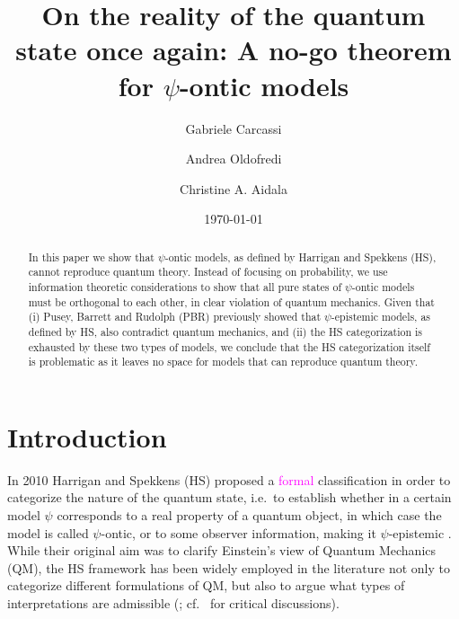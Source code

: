 \documentclass[10pt,twocolumn, nofootinbib]{revtex4-2}
\begin{document}
\title{On the reality of the quantum state once again: A no-go theorem for $\psi$-ontic models}
\author{Gabriele Carcassi}
\author{Andrea Oldofredi}
\author{Christine A. Aidala}
\vspace{2mm}

\date{\today}


\begin{abstract}
In this paper we show that $\psi$-ontic models, as defined by Harrigan and Spekkens (HS), cannot reproduce quantum theory. Instead of focusing on probability, we use information theoretic considerations to show that all pure states of $\psi$-ontic models must be orthogonal to each other, in clear violation of quantum mechanics. Given that (i) Pusey, Barrett and Rudolph (PBR) previously showed that $\psi$-epistemic models, as defined by HS, also contradict quantum mechanics, and (ii) the HS categorization is exhausted by these two types of models, we conclude that the HS categorization itself is problematic as it leaves no space for models that can reproduce quantum theory.
\end{abstract}

\maketitle

\section{Introduction}
 
In 2010 Harrigan and Spekkens (HS) proposed a \textcolor{magenta}{formal} classification in order to categorize the nature of the quantum state, i.e.\ to establish whether in a certain model $\psi$ corresponds to a real property of a quantum object, in which case the model is called $\psi$-ontic, or to some observer information, making it $\psi$-epistemic \cite{Harrigan:2010}. While their original aim was to clarify Einstein's view of Quantum Mechanics (QM), the HS framework has been widely employed in the literature not only to categorize different formulations of QM, but also to argue what types of interpretations are admissible (\cite{Leifer:2013, Leifer:2017, Branciard:2014, Hermens:2021, Wood:2015, Ringbauer:2015, Mazurek:2016, Bartlett:2012}; cf.\ \cite{Oldofredi:2020b, Ladyman:2021} for critical discussions). 
\end{document}
